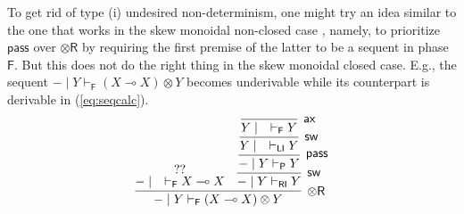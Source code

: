 \documentclass[copyright,creativecommons]{eptcs}
\theoremstyle{definition}
\newcommand{\tr}{\otimes \mathsf{R}}
\newcommand{\pass}{\mathsf{pass}}
\newcommand{\ax}{\mathsf{ax}}
\newcommand{\ot}{\otimes}
\newcommand{\lolli}{\multimap}
\newcommand{\RI}{\mathsf{RI}}
\newcommand{\LI}{\mathsf{LI}}
\newcommand{\Pass}{\mathsf{P}}
\newcommand{\F}{\mathsf{F}}
\begin{document}
To get rid of type (i) undesired non-determinism, one might try an idea similar to the one that works in the skew monoidal non-closed case \cite{uustalu:sequent:2021}, namely, to prioritize $\pass$ over $\tr$ by requiring the first premise of the latter to be a sequent in phase $\F$.
But this does not do the right thing in the skew monoidal closed case. E.g., the sequent ${-} \mid Y \vdash_{\F} (X \lolli X) \ot Y$ becomes underivable while its counterpart is derivable in (\ref{eq:seqcalc}).
\begin{equation*}\label{eq:counterexample0}
  \infer[\tr]{{-} \mid Y \vdash_{\F} (X \lolli X) \ot Y}{
    \deduce{{-} \mid \quad \vdash_{\F} X \lolli X}{??}
    &
    \infer[\mathsf{sw}]{{-} \mid Y \vdash_{\RI} Y}{
      \infer[\pass]{{-} \mid Y \vdash_{\Pass} Y}{
        \infer[\mathsf{sw}]{Y \mid \quad \vdash_{\LI} Y}{
          \infer[\ax]{Y \mid \quad \vdash_{\F} Y}{}
        }
      }
    }
  }
\end{equation*}
\end{document}
